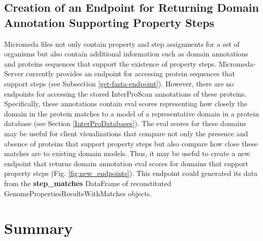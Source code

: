 \subsection{Creation of an Endpoint for Returning Domain Annotation Supporting Property Steps} \label{e-value-endpoint}

Micromeda files not only contain property and step assignments for a set of organisms but also contain additional information such as domain annotations and proteins sequences that support the existence of property steps. Micromeda-Server currently provides an endpoint for accessing protein sequences that support steps (see Subsection \ref{get-fasta-endpoint}). However, there are no endpoints for accessing the stored InterProScan annotations of these proteins. Specifically, these annotations contain \gls{eval} scores representing how closely the domain in the protein matches to a model of a representative domain in a protein database (see Section \ref{InterProDatabases}). The \gls{eval} scores for these domains may be useful for client visualizations that compare not only the presence and absence of proteins that support property steps but also compare how close these matches are to existing domain models. Thus, it may be useful to create a new endpoint that returns domain annotation \gls{eval} scores for domains that support property steps (Fig. \ref{fig:new_endpoints}). This endpoint could generated its data from the \textbf{step\_matches} DataFrame of reconstituted GenomePropertiesResultsWithMatches objects.

\section{Summary} \label{server-summary}

